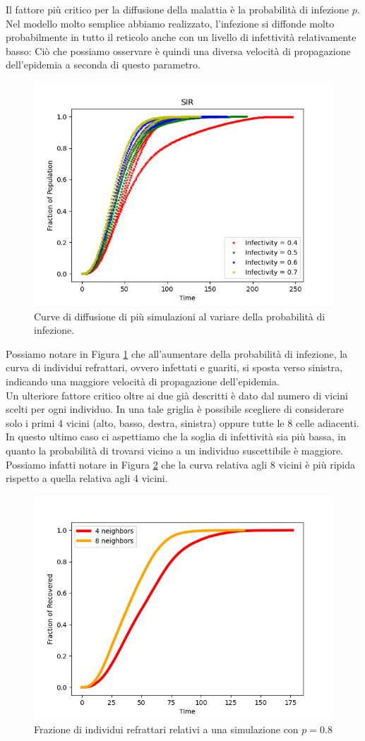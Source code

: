 \documentclass{article}
\begin{document}
    Il fattore più critico per la diffusione della malattia è la probabilità di infezione $p$. Nel modello molto semplice
    abbiamo realizzato, l'infezione si diffonde molto probabilmente in tutto il reticolo anche con un livello di infettività
    relativamente basso: Ciò che possiamo osservare è quindi una diversa velocità di propagazione dell'epidemia a seconda
    di questo parametro.
    \begin{figure}[H]
        \centering
        \includegraphics[width=0.6\linewidth]{../images/sir_infectivities}
        \caption{Curve di diffusione di più simulazioni al variare della probabilità di infezione.}
        \label{fig:sir_infectivities}
    \end{figure}
    Possiamo notare in Figura \ref{fig:sir_infectivities} che all'aumentare della probabilità di infezione, la curva di
    individui refrattari, ovvero infettati e guariti, si sposta verso sinistra, indicando una maggiore velocità di
    propagazione dell'epidemia.\\
    Un ulteriore fattore critico oltre ai due già descritti è dato dal numero di vicini scelti per ogni individuo. In una tale griglia
    è possibile scegliere di considerare solo i primi 4 vicini (alto, basso, destra, sinistra) oppure tutte le 8 celle adiacenti.
    In questo ultimo caso ci aspettiamo che la soglia di infettività sia più bassa, in quanto la probabilità di trovarsi
    vicino a un individuo suscettibile è maggiore. Possiamo infatti notare in Figura \ref{fig:sir_neighbors} che la curva
    relativa agli 8 vicini è più ripida rispetto a quella relativa agli 4 vicini.
    \begin{figure}[H]
        \centering
        \includegraphics[width=0.6\linewidth]{../images/sir_neighbors}
        \caption{Frazione di individui refrattari relativi a una simulazione con $p=0.8$}
        \label{fig:sir_neighbors}
    \end{figure}
\end{document}
